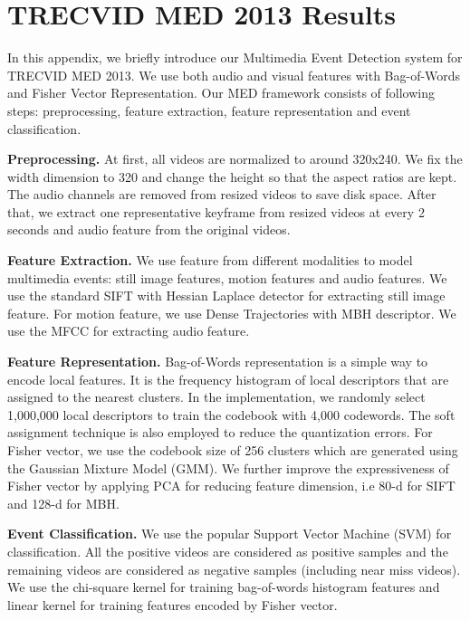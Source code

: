 \chapter{TRECVID MED 2013 Results} 

\ifpdf
\graphicspath{{Appendix1/Figs/Raster/}{Appendix1/Figs/PDF/}{Appendix1/Figs/}}
\else
\graphicspath{{Appendix1/Figs/Vector/}{Appendix1/Figs/}}
\fi

In this appendix, we briefly introduce our Multimedia Event Detection system for TRECVID MED 2013. We use both audio and visual features with Bag-of-Words and Fisher Vector Representation. Our MED framework consists of following steps: preprocessing, feature extraction, feature representation and event classification.

\textbf{Preprocessing.} At first, all videos are normalized to around 320x240. We fix the width dimension to 320 and change the height so that the aspect ratios are kept. The audio channels are removed from resized videos to save disk space. After that, we extract one representative keyframe from resized videos at every 2 seconds and audio feature from the original videos. 

\textbf{Feature Extraction.} We use feature from different modalities to model multimedia events: still image features, motion features and audio features. We use the standard SIFT with Hessian Laplace detector for extracting still image feature. For motion feature, we use Dense Trajectories with MBH descriptor. We use the MFCC for extracting audio feature. 

\textbf{Feature Representation.} Bag-of-Words representation is a simple way to encode local features. It is the frequency histogram of local descriptors that are assigned to the nearest clusters. In the implementation, we randomly select 1,000,000 local descriptors to train the codebook with 4,000 codewords. The soft assignment technique is also employed to reduce the quantization errors. For Fisher vector, we use the codebook size of 256 clusters which are generated using the Gaussian Mixture Model (GMM). We further improve the expressiveness of Fisher vector by applying PCA for reducing feature dimension, i.e 80-d for SIFT and 128-d for MBH. 

\textbf{Event Classification.}
We use the popular Support Vector Machine (SVM) for classification. All the positive videos are considered as positive samples and the remaining videos are considered as negative samples (including near miss videos). We use the chi-square kernel for training bag-of-words histogram features and linear kernel for training features encoded by Fisher vector.

